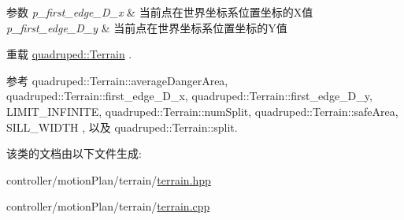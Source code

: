 \begin{DoxyParams}{参数}
{\em p\+\_\+first\+\_\+edge\+\_\+\+D\+\_\+x} & 当前点在世界坐标系位置坐标的\+X值 \\
\hline
{\em p\+\_\+first\+\_\+edge\+\_\+\+D\+\_\+y} & 当前点在世界坐标系位置坐标的\+Y值 \\
\hline
\end{DoxyParams}


重载 \hyperlink{classquadruped_1_1Terrain}{quadruped\+::\+Terrain} .



参考 quadruped\+::\+Terrain\+::average\+Danger\+Area, quadruped\+::\+Terrain\+::first\+\_\+edge\+\_\+\+D\+\_\+x, quadruped\+::\+Terrain\+::first\+\_\+edge\+\_\+\+D\+\_\+y, L\+I\+M\+I\+T\+\_\+\+I\+N\+F\+I\+N\+I\+TE, quadruped\+::\+Terrain\+::num\+Split, quadruped\+::\+Terrain\+::safe\+Area, S\+I\+L\+L\+\_\+\+W\+I\+D\+TH , 以及 quadruped\+::\+Terrain\+::split.



该类的文档由以下文件生成\+:\begin{DoxyCompactItemize}
\item 
controller/motion\+Plan/terrain/\hyperlink{terrain_8hpp}{terrain.\+hpp}\item 
controller/motion\+Plan/terrain/\hyperlink{terrain_8cpp}{terrain.\+cpp}\end{DoxyCompactItemize}
